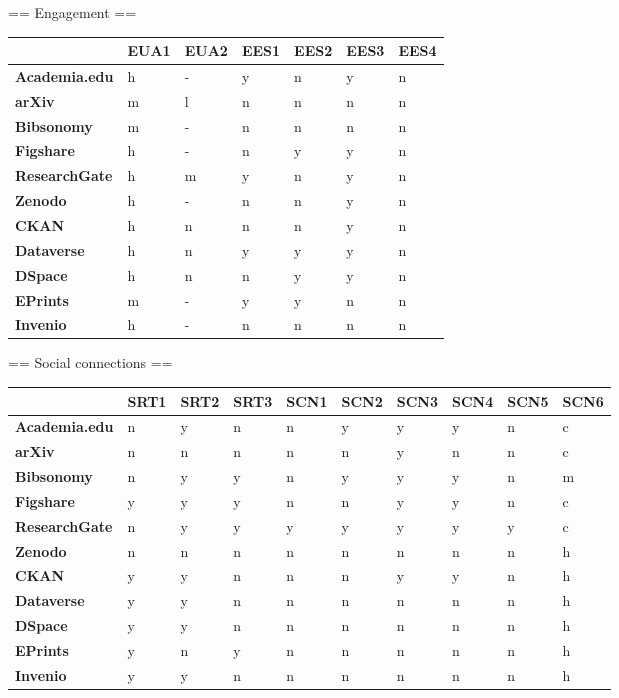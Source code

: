 == Engagement ==

\begin{tabular}{|m{2.1cm}|m{0.8cm}|m{0.8cm}|m{0.8cm}|m{0.8cm}|m{0.8cm}|m{0.8cm}|} \hline 
 & \textbf{EUA1}  & \textbf{EUA2}  & \textbf{EES1}  & \textbf{EES2}  & \textbf{EES3}  & \textbf{EES4}  \\ \hline 
\textbf{Academia.edu}  &h &- &y &n &y &n \\ \hline 
\textbf{arXiv}  &m &l &n &n &n &n \\ \hline 
\textbf{Bibsonomy}  &m &- &n &n &n &n \\ \hline 
\textbf{Figshare}  &h &- &n &y &y &n \\ \hline 
\textbf{ResearchGate}  &h &m &y &n &y &n \\ \hline 
\textbf{Zenodo}  &h &- &n &n &y &n \\ \hline 
 \hline 
\textbf{CKAN}  &h &n &n &n &y &n \\ \hline 
\textbf{Dataverse}  &h &n &y &y &y &n \\ \hline 
\textbf{DSpace}  &h &n &n &y &y &n \\ \hline 
\textbf{EPrints}  &m &- &y &y &n &n \\ \hline 
\textbf{Invenio}  &h &- &n &n &n &n \\ \hline 
 \end{tabular}


== Social connections ==

\begin{tabular}{|m{2.1cm}|m{0.8cm}|m{0.8cm}|m{0.8cm}|m{0.8cm}|m{0.8cm}|m{0.8cm}|m{0.8cm}|m{0.8cm}|m{0.8cm}|} \hline 
 & \textbf{SRT1}  & \textbf{SRT2}  & \textbf{SRT3}  & \textbf{SCN1}  & \textbf{SCN2}  & \textbf{SCN3}  & \textbf{SCN4}  & \textbf{SCN5}  & \textbf{SCN6}  \\ \hline 
\textbf{Academia.edu}  &n &y &n &n &y &y &y &n &c \\ \hline 
\textbf{arXiv}  &n &n &n &n &n &y &n &n &c \\ \hline 
\textbf{Bibsonomy}  &n &y &y &n &y &y &y &n &m \\ \hline 
\textbf{Figshare}  &y &y &y &n &n &y &y &n &c \\ \hline 
\textbf{ResearchGate}  &n &y &y &y &y &y &y &y &c \\ \hline 
\textbf{Zenodo}  &n &n &n &n &n &n &n &n &h \\ \hline 
 \hline 
\textbf{CKAN}  &y &y &n &n &n &y &y &n &h \\ \hline 
\textbf{Dataverse}  &y &y &n &n &n &n &n &n &h \\ \hline 
\textbf{DSpace}  &y &y &n &n &n &n &n &n &h \\ \hline 
\textbf{EPrints}  &y &n &y &n &n &n &n &n &h \\ \hline 
\textbf{Invenio}  &y &y &n &n &n &n &n &n &h \\ \hline 
 \end{tabular}


